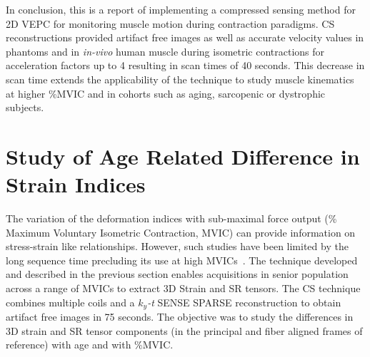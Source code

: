 In conclusion, this is a report of implementing a compressed sensing method for 2D VEPC for monitoring muscle motion during contraction paradigms. 
CS reconstructions provided artifact free images as well as accurate velocity values in phantoms and in \textit{in-vivo} human muscle during isometric contractions for acceleration factors up to 4 resulting in scan times of 40 seconds. 
This decrease in scan time extends the applicability of the technique to study muscle kinematics at higher \%MVIC and in cohorts such as aging, sarcopenic or dystrophic subjects.
\section{Study of Age Related Difference in Strain Indices}
\label{sec: CS_SRYO}
The variation of the deformation indices with sub-maximal force output (\% Maximum Voluntary Isometric Contraction, MVIC) can provide information on stress-strain like relationships. 
However, such studies have been limited by the long sequence time precluding its use at high MVICs~\cite{Malis:2018fr}. 
The technique developed and described in the previous section enables acquisitions in senior population across a range of MVICs to extract 3D Strain and SR tensors. 
The CS technique combines multiple coils and a $k_y$\textit{-t} SENSE SPARSE reconstruction to obtain artifact free images in 75 seconds. 
The objective was to study the differences in 3D strain and SR tensor components (in the principal and fiber aligned frames of reference) with age and with \%MVIC.

